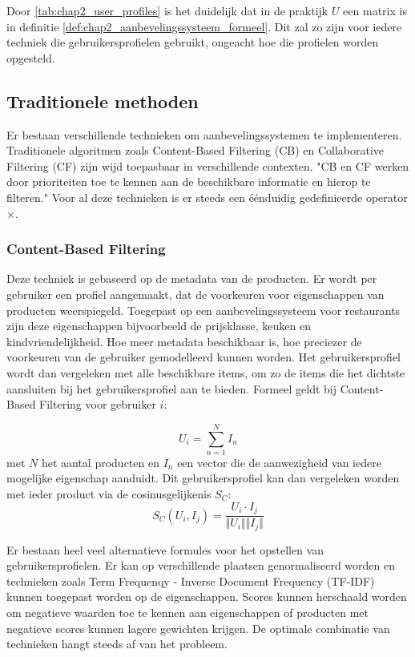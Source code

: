 Door \autoref{tab:chap2_user_profiles} is het duidelijk dat in de praktijk $U$ een matrix is in definitie \ref{def:chap2_aanbevelingssysteem_formeel}. Dit zal zo zijn voor iedere techniek die gebruikersprofielen gebruikt, ongeacht hoe die profielen worden opgesteld.

\subsection{Traditionele methoden}
\label{sec:chapt2_traditionele_methoden}
Er bestaan verschillende technieken om aanbevelingssystemen te implementeren. Traditionele algoritmen zoals Content-Based Filtering (CB) en Collaborative Filtering (CF) zijn wijd toepasbaar in verschillende contexten. "CB en CF werken door prioriteiten toe te kennen aan de beschikbare informatie en hierop te filteren." \cite{overzicht_technieken} Voor al deze technieken is er steeds een éénduidig gedefinieerde operator $\times$.


\subsubsection{Content-Based Filtering}
Deze techniek is gebaseerd op de metadata van de producten. Er wordt per gebruiker een profiel aangemaakt, dat de voorkeuren voor eigenschappen van producten weerspiegeld. Toegepast op een aanbevelingssysteem voor restaurants zijn deze eigenschappen bijvoorbeeld de prijsklasse, keuken en kindvriendelijkheid. Hoe meer metadata beschikbaar is, hoe preciezer de voorkeuren van de gebruiker gemodelleerd kunnen worden. Het gebruikersprofiel wordt dan vergeleken met alle beschikbare items, om zo de items die het dichtste aansluiten bij het gebruikersprofiel aan te bieden. Formeel geldt bij Content-Based Filtering voor gebruiker $i$:


\begin{equation}
    U_i = \sum_{n=1}^{N} I_n
    \label{eq:chap2_cb_user_profile}
\end{equation}
met $N$ het aantal producten en $I_n$ een vector die de aanwezigheid van iedere mogelijke eigenschap aanduidt. Dit gebruikersprofiel kan dan vergeleken worden met ieder product via de cosinusgelijkenis $S_C$:
\begin{equation}
    S_C(U_i, I_j) = \frac{U_i \cdot I_j}{\Vert U_i \Vert \Vert I_j \Vert}
    \label{eq:chap2_cb_cosine_similarity}
\end{equation}

Er bestaan heel veel alternatieve formules voor het opstellen van gebruikersprofielen. Er kan op verschillende plaatsen genormaliseerd worden en technieken zoals Term Frequenqy - Inverse Document Frequency (TF-IDF) kunnen toegepast worden op de eigenschappen. Scores kunnen herschaald worden om negatieve waarden toe te kennen aan eigenschappen of producten met negatieve scores kunnen lagere gewichten krijgen. De optimale combinatie van technieken hangt steeds af van het probleem.

